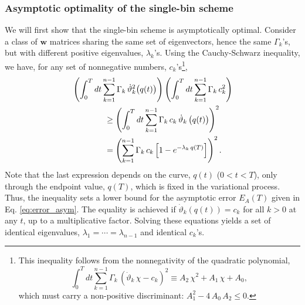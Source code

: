 \documentclass[reprint, superscriptaddress, floatfix]{revtex4-1}
\newcommand{\Err}{E}
\begin{document}
\subsubsection{\label{sec:optWL}
Asymptotic optimality of the single-bin scheme}



We will first show
that the single-bin scheme is asymptotically optimal.
%
Consider a class of $\mathbf w$ matrices
sharing the same set of eigenvectors,
hence the same $\Gamma_k$'s,
but with different positive eigenvalues,
$\lambda_k$'s.
%
Using the Cauchy-Schwarz inequality, we have,
for any set of nonnegative numbers, $c_k$'s\footnote{This
inequality follows from the nonnegativity of
the quadratic polynomial,
$$
\int_0^T
  dt \sum_{k = 1}^{n-1} \Gamma_k \,
    \left( {\dot \vartheta}_k \, \chi - c_k \right)^2
  \equiv
  A_2 \, \chi^2 + A_1 \, \chi + A_0
  ,
$$
which must carry a non-positive discriminant:
$A_1^2 - 4 \, A_0 \, A_2 \le 0$.},
%
%
\begin{align}
&
\left(
  \int_0^T dt
    \sum_{k = 1}^{n-1}
      \Gamma_k \, {\dot \vartheta}_k^2\bigl( q(t) \bigr)
\right)
%
\left(
  \int_0^T dt
    \sum_{k = 1}^{n-1}
      \Gamma_k \, c_k^2
\right)
%
\notag
\\
&
\qquad \qquad
\ge
\left(
  \int_0^T dt
    \sum_{k = 1}^{n-1}
      \Gamma_k \, c_k \, {\dot \vartheta}_k \, \bigl( q(t) \bigr)
\right)^2
\notag
\\
&
\qquad \qquad
=
\left(
  \sum_{k = 1}^{n-1} \Gamma_k \, c_k
    \left[
      1 - e^{ -\lambda_k \, q(T) }
    \right]
\right)^2.
\notag
\end{align}
%
Note that the last expression %
depends on the curve, $q(t)$ ($0 < t < T$),
only through the endpoint value, $q(T)$,
which is fixed in the variational process.
%
Thus, the inequality sets a lower bound
for the asymptotic error $\Err_A(T)$
given in Eq. \eqref{eq:error_asym}.
%
The equality is achieved
if $\dot \vartheta_k\left( q(t) \right) = c_k$
for all $k > 0$ at any $t$,
up to a multiplicative factor.
%
Solving these equations yields
a set of identical eigenvalues,
$\lambda_1 = \cdots = \lambda_{n-1}$
and identical $c_k$'s.
\end{document}
